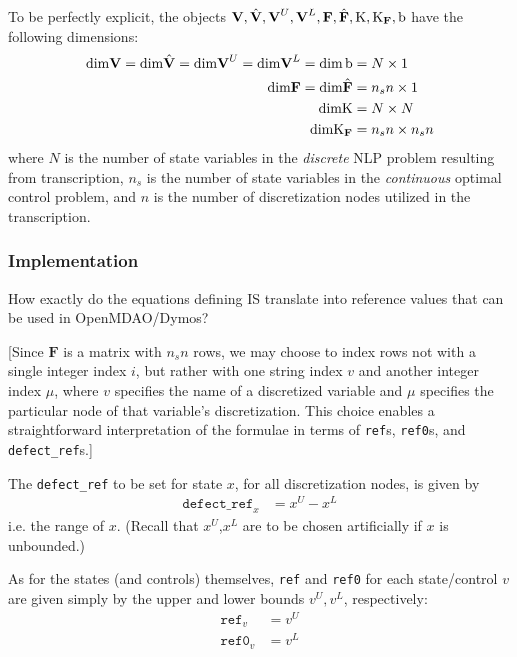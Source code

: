 \documentclass{article}
\begin{document}
\noindent
To be perfectly explicit, the objects $\textbf{V},\Hat{\textbf{V}},\textbf{V}^U,\textbf{V}^L,\textbf{F},\Hat{\textbf{F}},\text{K},\text{K}_\textbf{F},\text{b}$ have the following dimensions:
\begin{align*}
    \text{dim} \textbf{V} = \text{dim} \Hat{\textbf{V}} = \text{dim} \textbf{V}^U = \text{dim} \textbf{V}^L = \text{dim}\,\text{b} &= N \times 1 \\
    \text{dim} \textbf{F} = \text{dim} \Hat{\textbf{F}} &= n_sn \times 1 \\
    \text{dim} \text{K} &= N \times N \\
    \text{dim} \text{K}_\textbf{F} &= n_sn \times n_sn
\end{align*}
where $N$ is the number of state variables in the \textit{discrete} NLP problem resulting from transcription, $n_s$ is the number of state variables in the \textit{continuous} optimal control problem, and $n$ is the number of discretization nodes utilized in the transcription.

\subsubsection*{Implementation}

How exactly do the equations defining IS translate into reference values that can be used in OpenMDAO/Dymos?

[Since $\textbf{F}$ is a matrix with $n_sn$ rows, we may choose to index rows not with a single integer index $i$, but rather with one string index $v$ and another integer index $\mu$, where $v$ specifies the name of a discretized variable and $\mu$ specifies the particular node of that variable's discretization. This choice enables a straightforward interpretation of the formulae in terms of \texttt{ref}s, \texttt{ref0}s, and \texttt{defect\_ref}s.]

The \texttt{defect\_ref} to be set for state $x$, for all discretization nodes, is given by
\begin{align*}
    \texttt{defect\_ref}_x &= x^U - x^L
\end{align*}
i.e. the range of $x$. (Recall that $x^U$,$x^L$ are to be chosen artificially if $x$ is unbounded.)

As for the states (and controls) themselves, \texttt{ref} and \texttt{ref0} for each state/control $v$ are given simply by the upper and lower bounds $v^U,v^L$, respectively:
\begin{align*}
    \texttt{ref}_v &= v^U \\
    \texttt{ref0}_v &= v^L
\end{align*}
\end{document}

